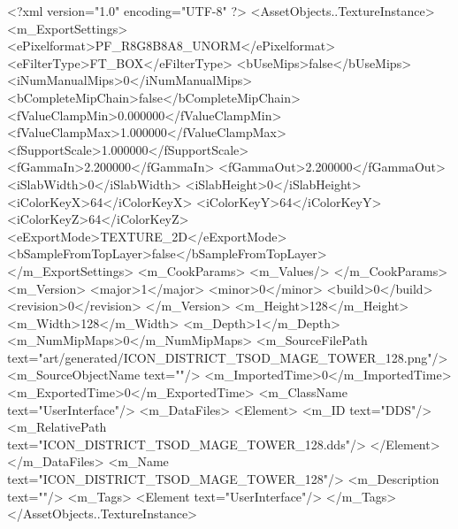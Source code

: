 <?xml version="1.0" encoding="UTF-8" ?>
<AssetObjects..TextureInstance>
	<m_ExportSettings>
		<ePixelformat>PF_R8G8B8A8_UNORM</ePixelformat>
		<eFilterType>FT_BOX</eFilterType>
		<bUseMips>false</bUseMips>
		<iNumManualMips>0</iNumManualMips>
		<bCompleteMipChain>false</bCompleteMipChain>
		<fValueClampMin>0.000000</fValueClampMin>
		<fValueClampMax>1.000000</fValueClampMax>
		<fSupportScale>1.000000</fSupportScale>
		<fGammaIn>2.200000</fGammaIn>
		<fGammaOut>2.200000</fGammaOut>
		<iSlabWidth>0</iSlabWidth>
		<iSlabHeight>0</iSlabHeight>
		<iColorKeyX>64</iColorKeyX>
		<iColorKeyY>64</iColorKeyY>
		<iColorKeyZ>64</iColorKeyZ>
		<eExportMode>TEXTURE_2D</eExportMode>
		<bSampleFromTopLayer>false</bSampleFromTopLayer>
	</m_ExportSettings>
	<m_CookParams>
		<m_Values/>
	</m_CookParams>
	<m_Version>
		<major>1</major>
		<minor>0</minor>
		<build>0</build>
		<revision>0</revision>
	</m_Version>
	<m_Height>128</m_Height>
	<m_Width>128</m_Width>
	<m_Depth>1</m_Depth>
	<m_NumMipMaps>0</m_NumMipMaps>
	<m_SourceFilePath text="art/generated/ICON_DISTRICT_TSOD_MAGE_TOWER_128.png"/>
	<m_SourceObjectName text=""/>
	<m_ImportedTime>0</m_ImportedTime>
	<m_ExportedTime>0</m_ExportedTime>
	<m_ClassName text="UserInterface"/>
	<m_DataFiles>
		<Element>
			<m_ID text="DDS"/>
			<m_RelativePath text="ICON_DISTRICT_TSOD_MAGE_TOWER_128.dds"/>
		</Element>
	</m_DataFiles>
	<m_Name text="ICON_DISTRICT_TSOD_MAGE_TOWER_128"/>
	<m_Description text=""/>
	<m_Tags>
		<Element text="UserInterface"/>
	</m_Tags>
</AssetObjects..TextureInstance>
